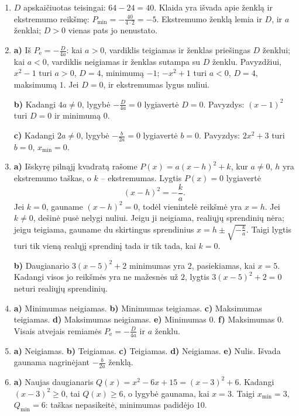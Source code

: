 \documentclass[12pt,a4paper]{article}
\begin{document}
\begin{enumerate}
3 temos 7 uždavinyje ekstremumai buvo rasti išskiriant pilnąjį kvadratą. Šiame uždavinyje taikėme formules, o gauti ekstremumai sutampa. Šiems pavyzdžiams formulės patogios, nes ekstremumą galima apskaičiuoti iš koeficientų; vis dėlto būdą rinkitės pagal daugianario pavidalą ir skaičiavimo patogumą.
\item $D$ apskaičiuotas teisingai: $64-24=40$. Klaida yra išvada apie ženklą ir ekstremumo reikšmę: $P_{\min}=-\frac{40}{4\cdot2}=-5$. Ekstremumo ženklą lemia ir $D$, ir $a$ ženklai; $D>0$ vienas pats jo nenustato.
\item \textbf{a)} Iš $P_{\mathrm e}=-\frac D{4a}$: kai $a>0$, vardiklis teigiamas ir ženklas priešingas $D$ ženklui; kai $a<0$, vardiklis neigiamas ir ženklas sutampa su $D$ ženklu. Pavyzdžiui, $x^2-1$ turi $a>0$, $D=4$, minimumą $-1$; $-x^2+1$ turi $a<0$, $D=4$, maksimumą $1$. Jei $D=0$, ir ekstremumas lygus nuliui.

\textbf{b)} Kadangi $4a\ne0$, lygybė $-\frac D{4a}=0$ lygiavertė $D=0$. Pavyzdys: $(x-1)^2$ turi $D=0$ ir minimumą $0$.

\textbf{c)} Kadangi $2a\ne0$, lygybė $-\frac b{2a}=0$ lygiavertė $b=0$. Pavyzdys: $2x^2+3$ turi $b=0$, $x_{\min}=0$.
\item \textbf{a)} Išskyrę pilnąjį kvadratą rašome $P(x)=a(x-h)^2+k$, kur $a\ne0$, $h$ yra ekstremumo taškas, o $k$ – ekstremumas. Lygtis $P(x)=0$ lygiavertė
\[
(x-h)^2=-\frac{k}{a}.
\]
Jei $k=0$, gauname $(x-h)^2=0$, todėl vienintelė reikšmė yra $x=h$. Jei $k\ne0$, dešinė pusė nelygi nuliui. Jeigu ji neigiama, realiųjų sprendinių nėra; jeigu teigiama, gauname du skirtingus sprendinius $x=h\pm\sqrt{-\frac{k}{a}}$. Taigi lygtis turi tik vieną realųjį sprendinį tada ir tik tada, kai $k=0$.

\textbf{b)} Daugianario $3(x-5)^2+2$ minimumas yra $2$, pasiekiamas, kai $x=5$. Kadangi visos jo reikšmės yra ne mažesnės už $2$, lygtis $3(x-5)^2+2=0$ neturi realiųjų sprendinių.
\item \textbf{a)} Minimumas neigiamas. \textbf{b)} Minimumas teigiamas. \textbf{c)} Maksimumas teigiamas. \textbf{d)} Maksimumas neigiamas. \textbf{e)} Minimumas $0$. \textbf{f)} Maksimumas $0$. Visais atvejais remiamės $P_{\mathrm e}=-\frac D{4a}$ ir $a$ ženklu.
\item \textbf{a)} Neigiamas. \textbf{b)} Teigiamas. \textbf{c)} Teigiamas. \textbf{d)} Neigiamas. \textbf{e)} Nulis. Išvada gaunama nagrinėjant $-\frac b{2a}$ ženklą.
\item \textbf{a)} Naujas daugianaris $Q(x)=x^2-6x+15=(x-3)^2+6$. Kadangi $(x-3)^2\ge0$, tai $Q(x)\ge6$, o lygybė gaunama, kai $x=3$. Taigi $x_{\min}=3$, $Q_{\min}=6$: taškas nepasikeitė, minimumas padidėjo $10$.


\end{enumerate}
\end{document}
